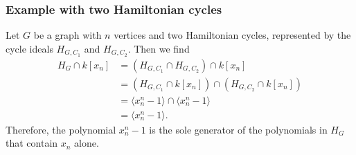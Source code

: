 \documentclass{beamer}
\begin{document}
\begin{frame}
\frametitle{Example with two Hamiltonian cycles}
Let $G$ be a graph with $n$ vertices and two Hamiltonian cycles, represented by the cycle ideals $H_{G,C_1}$ and $H_{G,C_2}$. Then we find
\begin{align*}
	H_G \cap k[x_n] &= (H_{G,C_1} \cap H_{G,C_2}) \cap k[x_n]\\
	&= (H_{G,C_1} \cap k[x_n]) \cap (H_{G,C_2} \cap k[x_n])\\
	&= \langle x_n^n - 1 \rangle \cap \langle x_n^n - 1 \rangle\\
	&= \langle x_n^n - 1 \rangle.
\end{align*}
Therefore, the polynomial $x_n^n - 1$ is the sole generator of the polynomials in $H_G$ that contain $x_n$ alone.
\end{frame}
\end{document}
